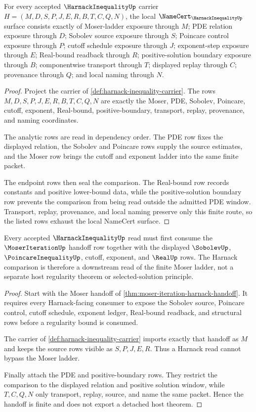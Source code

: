 \begin{theorem}
\label{thm:harnack-inequality-namecert-obligations}
For every accepted $\HarnackInequalityUp$ carrier $H=(M,D,S,P,J,E,R,B,T,C,Q,N)$, the local $\NameCert_{\HarnackInequalityUp}$ surface consists exactly of Moser-ladder exposure through $M$; PDE relation exposure through $D$; Sobolev source exposure through $S$; Poincare control exposure through $P$; cutoff schedule exposure through $J$; exponent-step exposure through $E$; Real-bound readback through $R$; positive-solution boundary exposure through $B$; componentwise transport through $T$; displayed replay through $C$; provenance through $Q$; and local naming through $N$.
\end{theorem}
\begin{proof}
Project the carrier of \autoref{def:harnack-inequality-carrier}. The rows $M,D,S,P,J,E,R,B,T,C,Q,N$ are exactly the Moser, PDE, Sobolev, Poincare, cutoff, exponent, Real-bound, positive-boundary, transport, replay, provenance, and naming coordinates.

The analytic rows are read in dependency order. The PDE row fixes the displayed relation, the Sobolev and Poincare rows supply the source estimates, and the Moser row brings the cutoff and exponent ladder into the same finite packet.

The endpoint rows then seal the comparison. The Real-bound row records constants and positive lower-bound data, while the positive-solution boundary row prevents the comparison from being read outside the admitted PDE window. Transport, replay, provenance, and local naming preserve only this finite route, so the listed rows exhaust the local NameCert surface.
\end{proof}

\begin{theorem}
\label{thm:harnack-inequality-moser-handoff}
Every accepted $\HarnackInequalityUp$ read must first consume the $\MoserIterationUp$ handoff row together with the displayed $\SobolevUp$, $\PoincareInequalityUp$, cutoff, exponent, and $\RealUp$ rows. The Harnack comparison is therefore a downstream read of the finite Moser ladder, not a separate host regularity theorem or selected-solution principle.
\end{theorem}
\begin{proof}
Start with the Moser handoff of \autoref{thm:moser-iteration-harnack-handoff}. It requires every Harnack-facing consumer to expose the Sobolev source, Poincare control, cutoff schedule, exponent ledger, Real-bound readback, and structural rows before a regularity bound is consumed.

The carrier of \autoref{def:harnack-inequality-carrier} imports exactly that handoff as $M$ and keeps the source rows visible as $S,P,J,E,R$. Thus a Harnack read cannot bypass the Moser ladder.

Finally attach the PDE and positive-boundary rows. They restrict the comparison to the displayed relation and positive solution window, while $T,C,Q,N$ only transport, replay, source, and name the same packet. Hence the handoff is finite and does not export a detached host theorem.
\end{proof}

